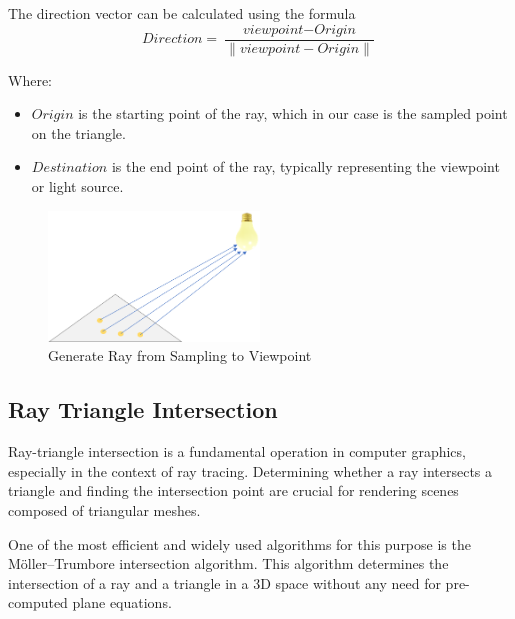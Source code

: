 \documentclass[11pt, a4paper,oneside,chapterprefix=false]{scrbook}
\begin{document}
\vspace{10pt}

The direction vector can be calculated using the formula 
\[
\textit{Direction} = \frac{\textit{viewpoint} - \textit{Origin}}{\|\textit{viewpoint} - \textit{Origin}\|}
\]

Where:
\begin{itemize}
    \item \(\textit{Origin}\) is the starting point of the ray, which in our case is the sampled point on the triangle.
    \item \(\textit{Destination}\) is the end point of the ray, typically representing the viewpoint or light source.
\end{itemize}

\begin{figure}[H]
    \centering
    \includegraphics*[width=0.5\textwidth]{figures/sample to vp.png}
    \caption{Generate Ray from Sampling to Viewpoint}
    \label{fig:generate ray from sampling to viewpoint}
\end{figure}


\subsection{Ray Triangle Intersection}

Ray-triangle intersection is a fundamental operation in computer graphics, especially in the context of ray tracing. Determining whether a ray intersects a triangle and finding the intersection point are crucial for rendering scenes composed of triangular meshes.



\vspace{10pt}

One of the most efficient and widely used algorithms for this purpose is the Möller–Trumbore intersection algorithm. This algorithm determines the intersection of a ray and a triangle in a 3D space without any need for pre-computed plane equations.

\vspace{10pt}
\end{document}
